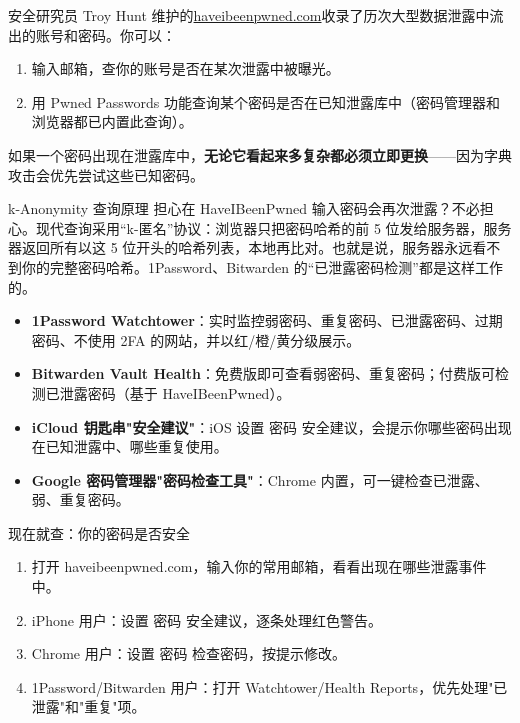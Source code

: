 安全研究员 Troy Hunt 维护的\href{https://haveibeenpwned.com}{haveibeenpwned.com}收录了历次大型数据泄露中流出的账号和密码。你可以：

\begin{enumerate}
  \item 输入邮箱，查你的账号是否在某次泄露中被曝光。
  \item 用 Pwned Passwords 功能查询某个密码是否在已知泄露库中（密码管理器和浏览器都已内置此查询）。
\end{enumerate}

如果一个密码出现在泄露库中，\textbf{无论它看起来多复杂都必须立即更换}——因为字典攻击会优先尝试这些已知密码。

\begin{tcbinfo}{k-Anonymity 查询原理}
担心在 HaveIBeenPwned 输入密码会再次泄露？不必担心。现代查询采用“k-匿名”协议：浏览器只把密码哈希的前 5 位发给服务器，服务器返回所有以这 5 位开头的哈希列表，本地再比对。也就是说，服务器永远看不到你的完整密码哈希。1Password、Bitwarden 的“已泄露密码检测”都是这样工作的。

\end{tcbinfo}


\begin{itemize}
  \item \textbf{1Password Watchtower}：实时监控弱密码、重复密码、已泄露密码、过期密码、不使用 2FA 的网站，并以红/橙/黄分级展示。
  \item \textbf{Bitwarden Vault Health}：免费版即可查看弱密码、重复密码；付费版可检测已泄露密码（基于 HaveIBeenPwned）。
  \item \textbf{iCloud 钥匙串"安全建议"}：iOS 设置 密码 安全建议，会提示你哪些密码出现在已知泄露中、哪些重复使用。
  \item \textbf{Google 密码管理器"密码检查工具"}：Chrome 内置，可一键检查已泄露、弱、重复密码。
\end{itemize}

\begin{tcbpractice}{现在就查：你的密码是否安全}
\begin{enumerate}
  \item 打开 haveibeenpwned.com，输入你的常用邮箱，看看出现在哪些泄露事件中。
  \item iPhone 用户：设置 密码 安全建议，逐条处理红色警告。
  \item Chrome 用户：设置 密码 检查密码，按提示修改。
  \item 1Password/Bitwarden 用户：打开 Watchtower/Health Reports，优先处理"已泄露"和"重复"项。
\end{enumerate}

\end{tcbpractice}

